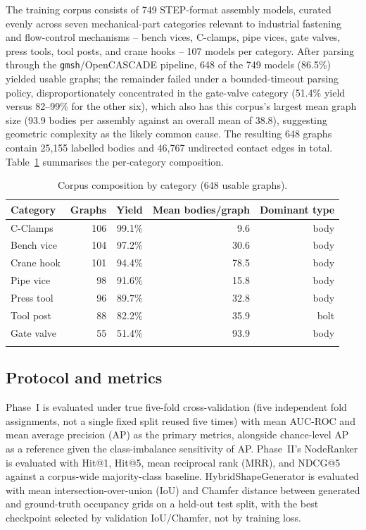 \documentclass[sn-mathphys,Numbered]{sn-jnl}
\begin{document}
The training corpus consists of 749 STEP-format assembly models, curated evenly across seven mechanical-part categories relevant to industrial fastening and flow-control mechanisms -- bench vices, C-clamps, pipe vices, gate valves, press tools, tool posts, and crane hooks -- 107 models per category. After parsing through the \texttt{gmsh}/OpenCASCADE pipeline, 648 of the 749 models (86.5\%) yielded usable graphs; the remainder failed under a bounded-timeout parsing policy, disproportionately concentrated in the gate-valve category (51.4\% yield versus 82--99\% for the other six), which also has this corpus's largest mean graph size (93.9 bodies per assembly against an overall mean of 38.8), suggesting geometric complexity as the likely common cause. The resulting 648 graphs contain 25{,}155 labelled bodies and 46{,}767 undirected contact edges in total. Table~\ref{tab:corpus} summarises the per-category composition.

\begin{table}[h]
\caption{Corpus composition by category (648 usable graphs).}\label{tab:corpus}
\begin{tabular}{@{}lrrrr@{}}
\toprule
Category & Graphs & Yield & Mean bodies/graph & Dominant type \\
\midrule
C-Clamps    & 106 & 99.1\% & 9.6  & body \\
Bench vice  & 104 & 97.2\% & 30.6 & body \\
Crane hook  & 101 & 94.4\% & 78.5 & body \\
Pipe vice   & 98  & 91.6\% & 15.8 & body \\
Press tool  & 96  & 89.7\% & 32.8 & body \\
Tool post   & 88  & 82.2\% & 35.9 & bolt \\
Gate valve  & 55  & 51.4\% & 93.9 & body \\
\botrule
\end{tabular}
\end{table}

\subsection{Protocol and metrics}\label{sec:protocol}

Phase~I is evaluated under true five-fold cross-validation (five independent fold assignments, not a single fixed split reused five times) with mean AUC-ROC and mean average precision (AP) as the primary metrics, alongside chance-level AP as a reference given the class-imbalance sensitivity of AP. Phase~II's NodeRanker is evaluated with Hit@1, Hit@5, mean reciprocal rank (MRR), and NDCG@5 against a corpus-wide majority-class baseline. HybridShapeGenerator is evaluated with mean intersection-over-union (IoU) and Chamfer distance between generated and ground-truth occupancy grids on a held-out test split, with the best checkpoint selected by validation IoU/Chamfer, not by training loss.
\end{document}
